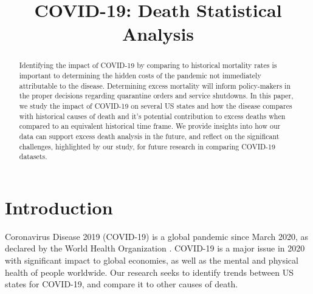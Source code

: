 \documentclass[conference]{IEEEtran}
\begin{document}
\title{COVID-19: Death Statistical Analysis}
\author{
\and
{}
\and
{}
}
\maketitle

\begin{abstract}
Identifying the impact of COVID-19 by comparing to historical mortality rates is important to determining the hidden costs of the pandemic not immediately attributable to the disease. 
Determining excess mortality will inform policy-makers in the proper decisions regarding quarantine orders and service shutdowns.
In this paper, we study the impact of COVID-19 on several US states and how the disease compares with historical causes of death and it's potential contribution to excess deaths when compared to an equivalent historical time frame.
We provide insights into how our data can support excess death analysis in the future, and reflect on the significant challenges, highlighted by our study, for future research in comparing COVID-19 datasets.
\end{abstract}

\section{Introduction}

Coronavirus Disease 2019 (COVID-19) is a global pandemic since March 2020, as declared by the World Health Organization \cite{cucinotta_who_2020}.
COVID-19 is a major issue in 2020 with significant impact to global economies, as well as the mental and physical health of people worldwide.
Our research seeks to identify trends between US states for COVID-19, and compare it to other causes of death.
\end{document}
